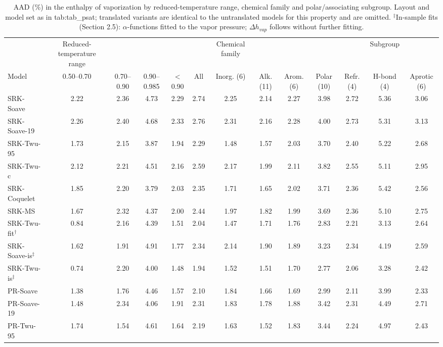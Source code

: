 \begin{table}[H]
\centering
\caption{AAD (\%) in the enthalpy of vaporization by reduced-temperature range, chemical family and polar/associating subgroup. Layout and model set as in {tab:tab_psat}; translated variants are identical to the untranslated models for this property and are omitted. $^{\ddagger}$In-sample fits (Section 2.5): $\alpha$-functions fitted to the vapor pressure; $\Delta h_{vap}$ follows without further fitting.}
\label{tab:tab_hvap}
\small
\begin{tabular}{lcccccccccccc}
\toprule
 & Reduced-temperature range &  &  &  &  & Chemical family &  &  &  &  & Subgroup &  \\
Model & 0.50--0.70 & 0.70--0.90 & 0.90--0.985 & < 0.90 & All & Inorg. (6) & Alk. (11) & Arom. (6) & Polar (10) & Refr. (4) & H-bond (4) & Aprotic (6) \\
\midrule
SRK-Soave & 2.22 & 2.36 & 4.73 & 2.29 & 2.74 & 2.25 & 2.14 & 2.27 & 3.98 & 2.72 & 5.36 & 3.06 \\
SRK-Soave-19 & 2.26 & 2.40 & 4.68 & 2.33 & 2.76 & 2.31 & 2.16 & 2.28 & 4.00 & 2.73 & 5.31 & 3.13 \\
SRK-Twu-95 & 1.73 & 2.15 & 3.87 & 1.94 & 2.29 & 1.48 & 1.57 & 2.03 & 3.70 & 2.40 & 5.22 & 2.68 \\
SRK-Twu-c & 2.12 & 2.21 & 4.51 & 2.16 & 2.59 & 2.17 & 1.99 & 2.11 & 3.82 & 2.55 & 5.11 & 2.95 \\
SRK-Coquelet & 1.85 & 2.20 & 3.79 & 2.03 & 2.35 & 1.71 & 1.65 & 2.02 & 3.71 & 2.36 & 5.42 & 2.56 \\
SRK-MS & 1.67 & 2.32 & 4.37 & 2.00 & 2.44 & 1.97 & 1.82 & 1.99 & 3.69 & 2.36 & 5.10 & 2.75 \\
\midrule
SRK-Twu-fit$^{\dagger}$ & 0.84 & 2.16 & 4.39 & 1.51 & 2.04 & 1.47 & 1.71 & 1.76 & 2.83 & 2.21 & 3.13 & 2.64 \\
SRK-Soave-is$^{\ddagger}$ & 1.62 & 1.91 & 4.91 & 1.77 & 2.34 & 2.14 & 1.90 & 1.89 & 3.23 & 2.34 & 4.19 & 2.59 \\
SRK-Twu-is$^{\ddagger}$ & 0.74 & 2.20 & 4.00 & 1.48 & 1.94 & 1.52 & 1.51 & 1.70 & 2.77 & 2.06 & 3.28 & 2.42 \\
\midrule
PR-Soave & 1.38 & 1.76 & 4.46 & 1.57 & 2.10 & 1.84 & 1.66 & 1.69 & 2.99 & 2.11 & 3.99 & 2.33 \\
PR-Soave-19 & 1.48 & 2.34 & 4.06 & 1.91 & 2.31 & 1.83 & 1.78 & 1.88 & 3.42 & 2.31 & 4.49 & 2.71 \\
PR-Twu-95 & 1.74 & 1.54 & 4.61 & 1.64 & 2.19 & 1.63 & 1.52 & 1.83 & 3.44 & 2.24 & 4.97 & 2.43 \\

\end{tabular}
\end{table}
